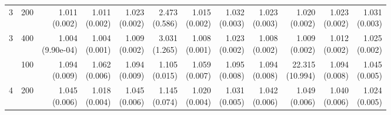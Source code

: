 \begin{table}[p]
{\begin{tabular}{llrrrrrrrrrr}
3 & 200 & \shortstack{1.011\\(0.002)} & \shortstack{1.011\\(0.002)} & \shortstack{1.023\\(0.002)} & \shortstack{2.473\\(0.586)} & \shortstack{1.015\\(0.002)} & \shortstack{1.032\\(0.003)} & \shortstack{1.023\\(0.003)} & \shortstack{1.020\\(0.002)} & \shortstack{1.023\\(0.002)} & \shortstack{1.031\\(0.003)} \\
3 & 400 & \shortstack{1.004\\(9.90e-04)} & \shortstack{1.004\\(0.001)} & \shortstack{1.009\\(0.002)} & \shortstack{3.031\\(1.265)} & \shortstack{1.008\\(0.001)} & \shortstack{1.023\\(0.002)} & \shortstack{1.008\\(0.002)} & \shortstack{1.009\\(0.002)} & \shortstack{1.012\\(0.002)} & \shortstack{1.025\\(0.002)} \\
\addlinespace
4 & 100 & \shortstack{1.094\\(0.009)} & \shortstack{1.062\\(0.006)} & \shortstack{1.094\\(0.009)} & \shortstack{1.105\\(0.015)} & \shortstack{1.059\\(0.007)} & \shortstack{1.095\\(0.008)} & \shortstack{1.094\\(0.008)} & \shortstack{22.315\\(10.994)} & \shortstack{1.094\\(0.008)} & \shortstack{1.045\\(0.005)} \\
4 & 200 & \shortstack{1.045\\(0.006)} & \shortstack{1.018\\(0.004)} & \shortstack{1.045\\(0.006)} & \shortstack{1.145\\(0.074)} & \shortstack{1.020\\(0.004)} & \shortstack{1.031\\(0.005)} & \shortstack{1.042\\(0.006)} & \shortstack{1.049\\(0.006)} & \shortstack{1.040\\(0.006)} & \shortstack{1.024\\(0.005)} \\

\end{tabular}}
\end{table}
